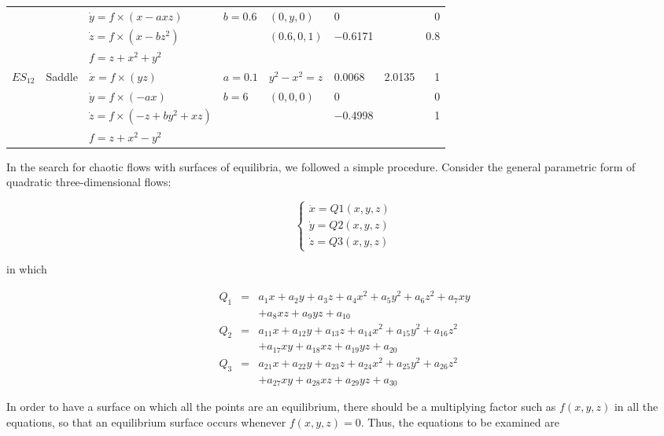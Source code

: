 \begin{table}[htbp]
\begin{tabular}{llllllrr}
 &  & \(\dot{y} = f\times(x − axz)\) & \(b = 0.6\) & \((0, y, 0)\) & 0 &  & 0\\
 &  & \(\dot{z} = f\times(x − bz^2)\) &  & \((0.6, 0, 1)\) & −0.6171 &  & 0.8\\
 &  & \(f = z + x^2 + y^2\) &  &  &  &  & \\
\hline
\(ES_{12}\) & Saddle & \(\dot{x} = f\times(yz)\) & \(a = 0.1\) & \(y^2 − x^2 = z\) & 0.0068 & 2.0135 & 1\\
 &  & \(\dot{y} = f\times(−ax)\) & \(b = 6\) & \((0, 0, 0)\) & 0 &  & 0\\
 &  & \(\dot{z} = f\times(-z + by^2 + xz)\) &  &  & −0.4998 &  & 1\\
 &  & \(f = z + x^2 − y^2\) &  &  &  &  & \\
\hline
\hline
\end{tabular}
\end{table}

In the search for chaotic flows with surfaces of equilibria,
we followed a simple procedure. Consider the general
parametric form of quadratic three-dimensional
flows:

\begin{equation}
\label{eq:sur_eq1}
  \left\{
  \begin{array}{l}
  \dot{x} = Q1(x, y, z)\\
  \dot{y} = Q2(x, y, z)\\
  \dot{z} = Q3(x, y, z)
  \end{array}
  \right.
\end{equation}

in which

\begin{eqnarray}
\label{eq:sur_eq2}
  Q_1 &=& a_1x + a_2y+a_3z+a_4x^2 + a_5y^2 + a_6z^2 + a_7xy\\\nonumber
  &&+ a_8xz + a_9yz + a_{10}\\\nonumber
  Q_2 &=& a_{11}x + a_{12}y + a_{13}z + a_{14}x^2 + a_{15}y^2 + a_{16}z^2\\\nonumber
  &&+ a_{17}xy + a_{18}xz + a_{19}yz + a_{20}\\\nonumber
  Q_3 &=& a_{21}x + a_{22}y + a_{23}z + a_{24}x^2 + a_{25}y^2 + a_{26}z^2\\\nonumber 
  && + a_{27}xy + a_{28}xz + a_{29}yz + a_{30}
\end{eqnarray}

In order to have a surface on which all the points are an
equilibrium, there should be a multiplying factor such
as \(f(x, y, z)\) in all the equations, so that an equilibrium
surface occurs whenever \(f(x, y, z) = 0\). Thus, the
equations to be examined are

